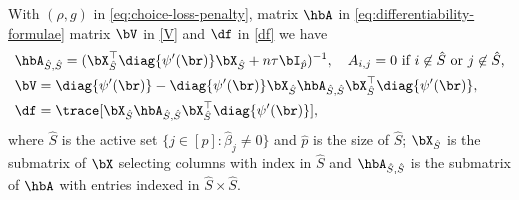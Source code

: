 \documentclass{colt2022} %
\numberwithin{equation}{section}
\begin{document}
\begin{example}
    \label{prop:huber-A-V}
    With $(\rho,g)$ in \eqref{eq:choice-loss-penalty}, matrix
    $\hbA$ in \eqref{eq:differentiability-formulae}
    matrix $\bV$ in \eqref{V} and
    $\df$ in \eqref{df} 
    we have 
    \begin{equation}
        \label{eq:huber-AVD}
    \begin{aligned}
        &\hbA_{\hat S, \hat S} = ( \bX_{\hat S}^{\top} \diag\{\psi'(\br)\} \bX_{\hat S} + n \tau \bI_{\hat p})^{-1},\quad
        A_{i,j} = 0 \text{ if $i \not \in \hat S$ or $j \not \in \hat S$,}
        \\
        &\bV = \diag\{\psi'(\br)\}
        -
            \diag\{\psi'(\br)\}
            \bX_{\hat S}
            \hbA_{\hat S, \hat S}
            \bX_{\hat S}^{\top}
            \diag\{\psi'(\br)\}
            ,
        \\
        &\df = \trace  [ \bX_{\hat S} 
            \hbA_{\hat S, \hat S}
        \bX_{\hat S}^{\top} \diag\{\psi'(\br)\} ],
    \end{aligned}
    \end{equation}
    where $\hat S$ is the active set $\{j \in [p] : \hat \beta _{j} \neq 0 \}$ and $\hat p $ is the size of $\hat S$;
    $\bX_{\hat S}$ is the submatrix of $\bX$ selecting columns with index in $\hat S$
    and 
    $\hbA_{\hat S, \hat S}$ is the submatrix of $\hbA$
    with entries indexed in $\hat S\times \hat S$.
\end{example}
\end{document}
